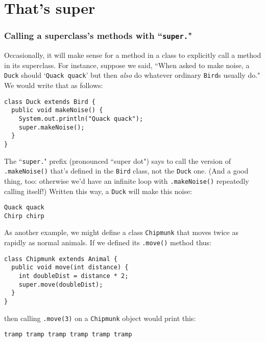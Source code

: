 \section{That's super}

\subsubsection{Calling a superclass's methods with ``\texttt{super.}"}

Occasionally, it will make sense for a method in a class to explicitly call a
method in its superclass. For instance, suppose we said, ``When asked to make
noise, a \texttt{Duck} should `\texttt{Quack quack}' but then \textit{also} do
whatever ordinary \texttt{Bird}s usually do." We would write that as follows:

\begin{Verbatim}[fontsize=\footnotesize,samepage=true,frame=single]
class Duck extends Bird {
  public void makeNoise() {
    System.out.println("Quack quack");
    super.makeNoise();
  }
}
\end{Verbatim}

The ``\texttt{super.}" prefix (pronounced ``super dot") says to call the
version of \texttt{.makeNoise()} that's defined in the \texttt{Bird}
class, not the \texttt{Duck} one. (And a good thing, too: otherwise we'd have
an infinite loop with \texttt{.makeNoise()} repeatedly calling itself!)
Written this way, a \texttt{Duck} will make this noise:

\begin{Verbatim}[fontsize=\small,samepage=true,frame=single]
Quack quack
Chirp chirp
\end{Verbatim}

As another example, we might define a class \texttt{Chipmunk} that moves twice
as rapidly as normal animals. If we defined its \texttt{.move()} method thus:

\begin{Verbatim}[fontsize=\footnotesize,samepage=true,frame=single]
class Chipmunk extends Animal {
  public void move(int distance) {
    int doubleDist = distance * 2;
    super.move(doubleDist);
  }
}
\end{Verbatim}

then calling \texttt{.move(3)} on a \texttt{Chipmunk} object would print this:

\begin{Verbatim}[fontsize=\small,samepage=true,frame=single]
tramp tramp tramp tramp tramp tramp
\end{Verbatim}


